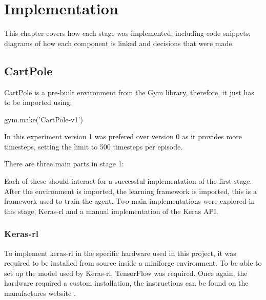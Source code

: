 \chapter{Implementation}
This chapter covers how each stage was implemented, including code snippets, diagrams of how each component is linked and decisions that were made.
\section{CartPole}
CartPole is a pre-built environment from the Gym library, therefore, it just has to be imported using:
\begin{center}
    gym.make('CartPole-v1')
\end{center}

In this experiment version 1 was prefered over version 0 as it provides more timesteps, setting the limit to 500 timesteps per episode.

There are three main parts in stage 1:
\begin{figure}[H]
    \centering
\end{figure}

Each of these should interact for a successful implementation of the first stage.
After the environment is imported, the learning framework is imported, this is a framework used to train the agent.
Two main implementations were explored in this stage, Keras-rl and a manual implementation of the Keras API.

    \subsection*{Keras-rl}
    To implement keras-rl\cite{kerasrl2} in the specific hardware used in this project, it was required to be installed from source inside a miniforge environment.
    To be able to set up the model used by Keras-rl, TensorFlow was required. Once again, the hardware required a custom installation, the instructions can be found on the manufactures website \cite{apple-tf}.

